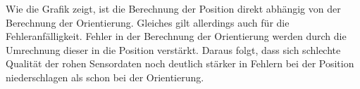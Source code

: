 Wie die Grafik zeigt, ist die Berechnung der Position direkt abhängig von der Berechnung der Orientierung. Gleiches gilt allerdings auch für die Fehleranfälligkeit. Fehler in der Berechnung der Orientierung werden durch die Umrechnung dieser in die Position verstärkt. Daraus folgt, dass sich schlechte Qualität der rohen Sensordaten noch deutlich stärker in Fehlern bei der Position niederschlagen als schon bei der Orientierung. 


